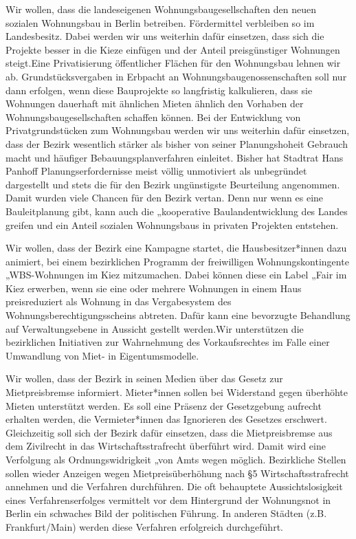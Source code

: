 \documentclass[a4paper,10pt]{article}
\begin{document}
Wir wollen, dass die landeseigenen Wohnungsbaugesellschaften den neuen
sozialen Wohnungsbau in Berlin betreiben. Fördermittel verbleiben so im
Landesbesitz. Dabei werden wir uns weiterhin dafür einsetzen, dass sich
die Projekte besser in die Kieze einfügen und der Anteil preisgünstiger
Wohnungen steigt.Eine Privatisierung öffentlicher Flächen für den
Wohnungsbau lehnen wir ab. Grundstücksvergaben in Erbpacht an
Wohnungsbaugenossenschaften soll nur dann erfolgen, wenn diese
Bauprojekte so langfristig kalkulieren, dass sie Wohnungen dauerhaft mit
ähnlichen Mieten ähnlich den Vorhaben der Wohnungsbaugesellschaften
schaffen können. Bei der Entwicklung von Privatgrundstücken zum
Wohnungsbau werden wir uns weiterhin dafür einsetzen, dass der Bezirk
wesentlich stärker als bisher von seiner Planungshoheit Gebrauch macht
und häufiger Bebauungsplanverfahren einleitet. Bisher hat Stadtrat Hans
Panhoff Planungserfordernisse meist völlig unmotiviert als unbegründet
dargestellt und stets die für den Bezirk ungünstigste Beurteilung
angenommen. Damit wurden viele Chancen für den Bezirk vertan. Denn nur
wenn es eine Bauleitplanung gibt, kann auch die „kooperative
Baulandentwicklung{\grqq} des Landes greifen und ein Anteil sozialen
Wohnungsbaus in privaten Projekten entstehen.

Wir wollen, dass der Bezirk eine Kampagne startet, die
Hausbesitzer*innen dazu animiert, bei einem bezirklichen Programm der
freiwilligen Wohnungskontingente „WBS-Wohnungen im Kiez{\grqq} mitzumachen.
Dabei können diese ein Label „Fair im Kiez{\grqq} erwerben, wenn sie eine
oder mehrere Wohnungen in einem Haus preisreduziert als Wohnung in das
Vergabesystem des Wohnungsberechtigungsscheins abtreten. Dafür kann eine
bevorzugte Behandlung auf Verwaltungsebene in Aussicht gestellt
werden.Wir unterstützen die bezirklichen Initiativen zur Wahrnehmung des
Vorkaufsrechtes im Falle einer Umwandlung von Miet- in Eigentumsmodelle.

Wir wollen, dass der Bezirk in seinen Medien über das Gesetz zur
Mietpreisbremse informiert. Mieter*innen sollen bei Widerstand
gegen überhöhte Mieten unterstützt werden. Es soll eine Präsenz der
Gesetzgebung aufrecht erhalten werden, die Vermieter*innen das
Ignorieren des Gesetzes erschwert. Gleichzeitig soll sich der Bezirk
dafür einsetzen, dass die Mietpreisbremse aus dem Zivilrecht in das
Wirtschaftsstrafrecht überführt wird. Damit wird eine Verfolgung als
Ordnungswidrigkeit „von Amts wegen{\grqq} möglich. Bezirkliche Stellen sollen
wieder Anzeigen wegen Mietpreisüberhöhung nach §5 Wirtschaftsstrafrecht
annehmen und die Verfahren durchführen. Die oft behauptete
Aussichtslosigkeit eines Verfahrenserfolges vermittelt vor dem
Hintergrund der Wohnungsnot in Berlin ein schwaches Bild der politischen
Führung. In anderen Städten (z.B. Frankfurt/Main) werden diese Verfahren
erfolgreich durchgeführt.
\end{document}

